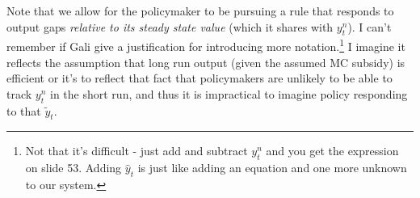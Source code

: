 \documentclass[authoryear,11pt]{elsarticle}
\begin{document}
Note that we allow for the policymaker to be pursuing a rule that responds to output gaps \textit{relative to its steady state value} (which it shares with $y_{t}^{n}$). I can't remember if Gali give a justification for introducing more notation.\footnote{Not that it's difficult - just add and subtract $y_{t}^{n}$ and you get the expression on slide 53. Adding $\hat{y}_{t}$ is just like adding an equation and one more unknown to our system.} I imagine it reflects the assumption that long run output (given the assumed MC subsidy) is efficient or it's to reflect that fact that policymakers are unlikely to be able to track $y_{t}^{n}$ in the short run, and thus it is impractical to imagine policy responding to that $\tilde{y}_{t}$.
\end{document}
